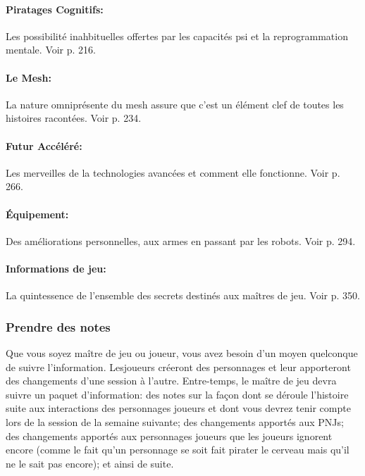 \paragraph{Piratages Cognitifs:} Les possibilité inahbituelles offertes par les capacités psi et la reprogrammation mentale. Voir p. 216. 

\paragraph{Le Mesh:} La nature omniprésente du mesh assure que c'est un élément clef de toutes les histoires racontées. Voir p. 234. 

\paragraph{Futur Accéléré:} Les merveilles de la technologies avancées et comment elle fonctionne. Voir p. 266. 

\paragraph{Équipement:} Des améliorations personnelles, aux armes en passant par les robots. Voir p. 294. 

\paragraph{Informations de jeu:} La quintessence de l'ensemble des secrets destinés aux maîtres de jeu. Voir p. 350. 



\subsubsection{Prendre des notes} \label{sec:taking-notes} 

Que vous soyez maître de jeu ou joueur, vous avez besoin d'un moyen quelconque de suivre l'information. Lesjoueurs créeront des personnages et leur apporteront des changements d'une session à l'autre. Entre-temps, le maître de jeu devra suivre un paquet d'information: des notes sur la façon dont se déroule l'histoire suite aux interactions des personnages joueurs et dont vous devrez tenir compte lors de la session de la semaine suivante; des changements apportés aux PNJs; des changements apportés aux personnages joueurs que les joueurs ignorent encore (comme le fait qu'un personnage se soit fait pirater le cerveau mais qu'il ne le sait pas encore); et ainsi de suite. 

